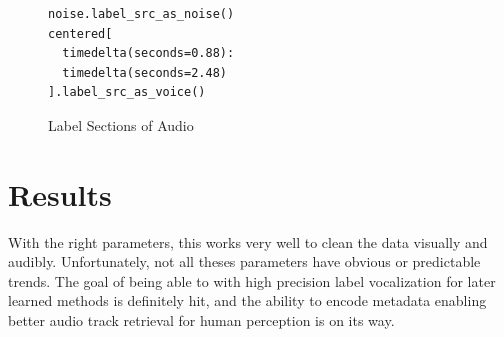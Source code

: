 \documentclass{article}
\begin{document}
\begin{multicols}{2}
\begin{figure}[H]
  \centering
  \begin{lstlisting}
noise.label_src_as_noise()
centered[
  timedelta(seconds=0.88):
  timedelta(seconds=2.48)
].label_src_as_voice()
\end{lstlisting}

  \caption{Label Sections of Audio}
  \label{fig:labeling}
\end{figure}


\section{Results}

With the right parameters, this works very well to clean the data visually and audibly. Unfortunately, not all theses parameters have obvious or predictable trends. The goal of being able to with high precision label vocalization for later learned methods is definitely hit, and the ability to encode metadata enabling better audio track retrieval for human perception is on its way.

{}




\end{multicols}
\end{document}
